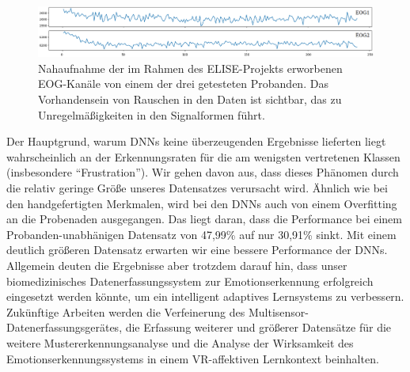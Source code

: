 \begin{figure}[H]
\includegraphics[width=\textwidth]{Images/zoom.png} 
\vspace{-0.3cm} \caption[Nahaufnahme von Rauschen in Daten]{ Nahaufnahme der im Rahmen des ELISE-Projekts erworbenen EOG-Kan{\"a}le von einem der drei getesteten Probanden. Das Vorhandensein von Rauschen in den Daten ist sichtbar, das zu Unregelm{\"a}{\ss}igkeiten in den Signalformen f{\"u}hrt. }
\label{fig:zoom} \end{figure} \vspace{0.5cm}




Der Hauptgrund, warum DNNs keine überzeugenden Ergebnisse lieferten liegt wahrscheinlich an der Erkennungsraten f{\"u}r die am wenigsten vertretenen Klassen (insbesondere ``Frustration'').
Wir gehen davon aus, dass dieses Ph{\"a}nomen durch die relativ geringe Gr{\"o}{\ss}e unseres Datensatzes verursacht wird. 
Ähnlich wie bei den handgefertigten Merkmalen, wird bei den DNNs auch von einem Overfitting an die Probenaden ausgegangen.
Das liegt daran, dass die Performance bei einem Probanden-unabhänigen Datensatz von 47,99\% auf nur 30,91\% sinkt.
Mit einem deutlich größeren Datensatz erwarten wir eine bessere Performance der DNNs.\\






Allgemein deuten die Ergebnisse aber trotzdem darauf hin, dass unser biomedizinisches Datenerfassungssystem zur Emotionserkennung erfolgreich eingesetzt werden k{\"o}nnte, um ein intelligent adaptives Lernsystems zu verbessern. 
Zuk{\"u}nftige Arbeiten werden die Verfeinerung des Multisensor-Datenerfassungsger{\"a}tes, die Erfassung weiterer und gr{\"o}{\ss}erer Datens{\"a}tze f{\"u}r die weitere Mustererkennungsanalyse und die Analyse der Wirksamkeit des Emotionserkennungssystems in einem VR-affektiven Lernkontext beinhalten.
